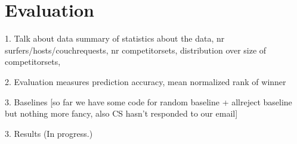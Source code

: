 \section{Evaluation}
 
1. Talk about data
summary of statistics about the data, nr surfers/hosts/couchrequests, nr competitorsets, distribution over size of competitorsets, 

2. Evaluation measures
prediction accuracy, mean normalized rank of winner

3. Baselines
[so far we have some code for random baseline + allreject baseline but nothing more fancy, also CS hasn't responded to our email]

3. Results
(In progress.)
